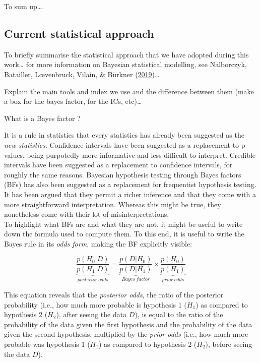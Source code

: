 \documentclass[a4paper,12pt,twoside,openright,oldfontcommands]{memoir}
\begin{document}
To sum up\ldots{}.

\subsection{Current statistical
approach}\label{current-statistical-approach}

To briefly summarise the statistical approach that we have adopted
during this work\ldots{} for more information on Bayesian statistical
modelling, see Nalborczyk, Batailler, Lœvenbruck, Vilain, \& Bürkner
(\protect\hyperlink{ref-nalborczyk_introduction_2019}{2019})\ldots{}

Explain the main tools and index we use and the difference between them
(make a box for the bayes factor, for the ICs, etc)\ldots{}

\begin{mybox}[label = BF]{What is a Bayes factor ?}

It is a rule in statistics that every statistics has already been suggested as the \textit{new statistics}. Confidence intervals have been suggested as a replacement to p-values, being purpotedly more informative and less difficult to interpret. Credible intervals have been suggested as a replacement to confidence intervals, for roughly the same reasons. Bayesian hypothesis testing through Bayes factors (BFs) has also been suggested as a replacement for frequentist hypothesis testing. It has been argued that they permit a richer inference and that they come with a more straightforward interpretation. Whereas this might be true, they nonetheless come with their lot of misinterpretations.\\

To highlight what BFs are and what they are not, it might be useful to write down the formula used to compute them. To this end, it is useful to write the Bayes rule in its \textit{odds form}, making the BF explicitly visible:

$$\underbrace{\dfrac{p(H_{0}|D)}{p(H_{1}|D)}}_{posterior\ odds} = \underbrace{\dfrac{p(D|H_{0})}{p(D|H_{1})}}_{Bayes\ factor} \times \underbrace{\dfrac{p(H_{0})}{p(H_{1})}}_{prior\ odds}$$

This equation reveals that the \textit{posterior odds}, the ratio of the posterior probability (i.e., how much more probable is hypothesis 1 ($H_{1}$) as compared to hypothesis 2 ($H_{2}$), after seeing the data $D$), is equal to the ratio of the probability of the data given the first hypothesis and the probability of the data given the second hypothesis, multiplied by the \textit{prior odds} (i.e., how much more probable was hypothesis 1 ($H_{1}$) as compared to hypothesis 2 ($H_{2}$), before seeing the data $D$).\\ 


\end{mybox}
\end{document}
